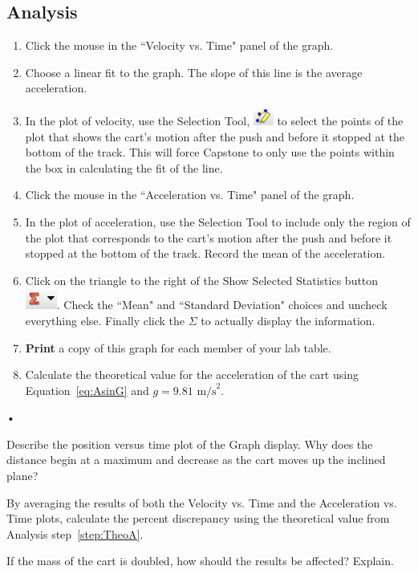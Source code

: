 \documentclass[main.tex]{subfiles}
\begin{document}
\subsection*{Analysis}
\begin{enumerate}
\item
Click the mouse in the ``Velocity vs. Time" panel of the graph.
\item
Choose a linear fit to the graph. The slope of this line is the average acceleration.
\item
In the plot of velocity, use the Selection Tool, \includegraphics{Selection_Tool} to select the points of the plot that shows the cart's motion after the push and before it stopped at the bottom of the track. This will force Capstone to only use the points within the box in calculating the fit of the line.
\item
Click the mouse in the ``Acceleration vs. Time" panel of the graph.
\item
In the plot of acceleration, use the Selection Tool to include only the region of the plot that corresponds to the cart's motion after the push and before it stopped at the bottom of the track. Record the mean of the acceleration.
\item
Click on the triangle to the right of the Show Selected Statistics button \includegraphics{Statistics}. Check the ``Mean" and ``Standard Deviation" choices and uncheck everything else. Finally click the $\Sigma$ to actually display the information. 
\item
\textbf{Print} a copy of this graph for each member of your lab table.
\item \label{step:TheoA}
Calculate the theoretical value for the acceleration of the cart using Equation~\eqref{eq:AsinG} and $g=9.81 \text{ m/s}^2.$
\end{enumerate}•

\begin{question}
Describe the position versus time plot of the Graph display. Why does the distance begin at a maximum and decrease as the cart moves up the inclined plane?
\end{question}
\begin{question}
By averaging the results of both the Velocity vs. Time and the Acceleration vs. Time plots, calculate the percent discrepancy using the theoretical value from Analysis step~\ref{step:TheoA}.
\end{question}
\begin{question}
If the mass of the cart is doubled, how should the results be affected? Explain.
\end{question}
\end{document}
